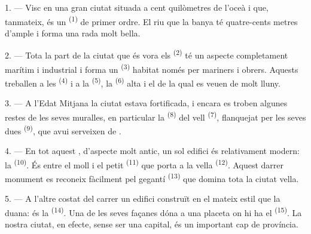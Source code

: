 
\VUsaut{2.0mm}
\VUsaut{3.0mm}
\VUfilet{16mm}
\VUsaut{5.6mm}
\VUsaut{1.4mm}
\VUsaut{2.2mm}

\VUsaut{3.0mm}

1. --- Visc en una gran ciutat situada a cent quilòmetres de l'oceà i que,
tanmateix, és un  \textsuperscript{(1)} de primer ordre. El riu que la
banya té quatre-cents metres d'ample i forma una rada molt bella.

2. --- Tota la part de la ciutat que és vora els 
\textsuperscript{(2)} té un aspecte completament marítim i industrial i forma un
 \textsuperscript{(3)} habitat només per mariners i obrers. Aquests
treballen a les  \textsuperscript{(4)} i a la  \textsuperscript{(5)}, la  \textsuperscript{(6)} alta i el
 de la qual es veuen de molt lluny.

3. --- A l'Edat Mitjana la ciutat estava fortificada, i encara es troben algunes
restes de les seves muralles, en particular la 
\textsuperscript{(8)} del vell  \textsuperscript{(7)},
flanquejat per les seves dues  \textsuperscript{(9)}, que avui
serveixen de .

4. --- En tot aquest , d'aspecte molt antic, un sol edifici és
relativament modern: la  \textsuperscript{(10)}. És entre el moll i
el petit  \textsuperscript{(11)} que porta a la vella  \textsuperscript{(12)}. Aquest darrer monument es reconeix fàcilment
pel gegantí  \textsuperscript{(13)} que domina tota la ciutat
vella.

5. --- A l'altre costat del carrer  un edifici construït en el
mateix estil que la duana: és la  \textsuperscript{(14)}. Una de les
seves façanes dóna a una placeta on hi ha el 
\textsuperscript{(15)}. La nostra ciutat, en efecte, sense ser una capital, és un
important cap de província.

